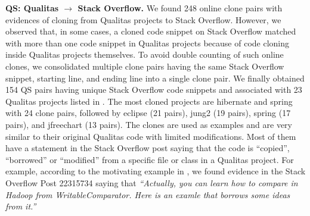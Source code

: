 \documentclass[10pt,journal,compsoc]{IEEEtran}
\begin{document}
\textbf{QS: Qualitas $\rightarrow$ Stack Overflow.} We found 248 online clone
pairs with evidences of cloning from Qualitas projects to Stack Overflow.
However, we observed that, in some cases, a cloned code snippet on Stack
Overflow matched with more than one code snippet in Qualitas projects because of
code cloning inside Qualitas projects themselves. To avoid double counting of
such online clones, we consolidated multiple clone pairs having the same Stack
Overflow snippet, starting line, and ending line into a single clone pair. We
finally obtained 154 QS pairs having unique Stack Overflow code snippets and
associated with 23 Qualitas projects listed in .
The most cloned projects are \textsf{hibernate} and \textsf{spring} with 24
clone pairs, followed by \textsf{eclipse} (21 pairs), \textsf{jung2} (19 pairs),
\textsf{spring} (17 pairs), and \textsf{jfreechart} (13 pairs). The clones are
used as examples and are very similar to their original Qualitas code with
limited modifications. Most of them have a statement in the Stack Overflow post
saying that the code is ``copied'', ``borrowed'' or ``modified'' from a specific
file or class in a Qualitas project. For example, according to the motivating
example in , we found evidence in the Stack Overflow Post
22315734 saying that \textit{``Actually, you can learn how to compare in Hadoop
from WritableComparator. Here is an examle that borrows some ideas from it.''}
\end{document}
